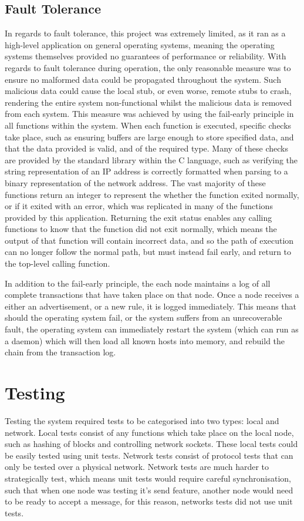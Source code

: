 \documentclass[a4paper, 11pt]{report}
\begin{document}
\section{Fault Tolerance}
In regards to fault tolerance, this project was extremely limited, as it ran as a high-level application on general operating systems, meaning the operating systems themselves provided no guarantees of  performance or reliability. With regards to fault tolerance during operation, the only reasonable measure was to ensure no malformed data could be propagated throughout the system. Such malicious data could cause the local \gls{stub}, or even worse, remote \gls{stub}s to crash, rendering the entire system non-functional whilst the malicious data is removed from each system. This measure was achieved by using the fail-early principle in all functions within the system. When each function is executed, specific checks take place, such as ensuring buffers are large enough to store specified data, and that the data provided is valid, and of the required type. Many of these checks are provided by the standard library within the C language, such as verifying the string representation of an \acrshort{IP} address is  correctly formatted when parsing to a binary representation of the network address. The vast majority of these functions return an integer to represent the whether the function exited normally, or if it exited with an error, which was replicated in many of the functions provided by this application. Returning the exit status enables any calling functions to know that the function did not exit normally, which means the output of that function will contain incorrect data, and so the path of execution can no longer follow the normal path, but must instead fail early, and return to the top-level calling function.

In addition to the fail-early principle, the each node maintains a log of all complete transactions that have taken place on that node. Once a node receives a either an advertisement, or a new rule, it is logged immediately. This means that should the operating system fail, or the system suffers from an unrecoverable fault, the operating system can immediately restart the system (which can run as a daemon) which will then load all known hosts into memory, and rebuild the chain from the transaction log.

\chapter{Testing}
Testing the system required tests to be categorised into two types: local and network. Local tests consist of any functions which take place on the local node, such as hashing of blocks and controlling network sockets. These local tests could be easily tested using unit tests. Network tests consist of protocol tests that can only be tested over a physical network. Network tests are much harder to strategically test, which means unit tests would require careful synchronisation, such that when one node was testing it's send feature, another node would need to be ready to accept a message, for this reason, networks tests did not use unit tests.
\end{document}
